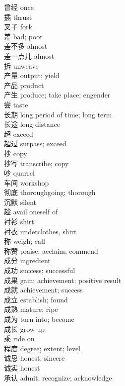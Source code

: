 曾经 \quad once\\
插 \quad thrust\\
叉子 \quad fork\\
差 \quad bad; poor\\
差不多 \quad almost\\
差一点儿 \quad almost\\
拆 \quad unweave\\
产量 \quad output; yield\\
产品 \quad product\\
产生 \quad produce; take place; engender\\
尝 \quad taste\\
长期 \quad long period of time; long term\\
长途 \quad long distance\\
超 \quad exceed\\
超过 \quad surpass; exceed\\
抄 \quad copy\\
抄写 \quad transcribe; copy\\
吵 \quad quarrel\\
车间 \quad workshop\\
彻底 \quad thoroughgoing; thorough\\
沉默 \quad silent\\
趁 \quad avail oneself of\\
衬衫 \quad shirt\\
衬衣 \quad underclothes, shirt\\
称 \quad weigh; call\\
称赞 \quad praise; acclaim; commend\\
成分 \quad ingredient\\
成功 \quad success; successful\\
成果 \quad gain; achievement; positive result\\
成就 \quad achievement; success\\
成立 \quad establish; found\\
成熟 \quad mature; ripe\\
成为 \quad turn into; become\\
成长 \quad grow up\\
乘 \quad ride on\\
程度 \quad degree; extent; level\\
诚恳 \quad honest; sincere\\
诚实 \quad honest\\
承认 \quad admit; recognize; acknowledge\\
